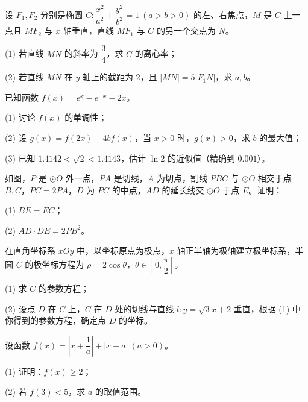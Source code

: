\begin{question}
设 $F_1,F_2$ 分别是椭圆 $C:\dfrac{x^2}{a^2}+\dfrac{y^2}{b^2}=1\ (a>b>0)$ 的左、右焦点，$M$ 是 $C$ 上一点且 $MF_2$ 与 $x$ 轴垂直，直线 $MF_1$ 与 $C$ 的另一个交点为 $N$。

(1) 若直线 $MN$ 的斜率为 $\dfrac34$，求 $C$ 的离心率；

(2) 若直线 $MN$ 在 $y$ 轴上的截距为 $2$，且 $|MN|=5|F_1N|$，求 $a,b$。

\end{question}
\begin{question}
已知函数 $f(x)=e^x-e^{-x}-2x$。

(1) 讨论 $f(x)$ 的单调性；

(2) 设 $g(x)=f(2x)-4bf(x)$，当 $x>0$ 时，$g(x)>0$，求 $b$ 的最大值；

(3) 已知 $1.4142<\sqrt2<1.4143$，估计 $\ln2$ 的近似值（精确到 $0.001$）。

\Needspace{0.4\textheight}
\end{question}
\begin{question}
如图，$P$ 是 $\odot O$ 外一点，$PA$ 是切线，$A$ 为切点，割线 $PBC$ 与 $\odot O$ 相交于点 $B,C$，$PC=2PA$，$D$ 为 $PC$ 的中点，$AD$ 的延长线交 $\odot O$ 于点 $E$。证明：
\nopagebreak[4]
\begin{center}\end{center}
\nopagebreak[4]
(1) $BE=EC$；

(2) $AD\cdot DE=2PB^2$。

\end{question}
\begin{question}
在直角坐标系 $xOy$ 中，以坐标原点为极点，$x$ 轴正半轴为极轴建立极坐标系，半圆 $C$ 的极坐标方程为 $\rho=2\cos\theta$，$\theta\in\left[0,\dfrac\pi2\right]$。

(1) 求 $C$ 的参数方程；

(2) 设点 $D$ 在 $C$ 上，$C$ 在 $D$ 处的切线与直线 $l:y=\sqrt3x+2$ 垂直，根据 (1) 中你得到的参数方程，确定点 $D$ 的坐标。

\end{question}
\begin{question}
设函数 $f(x)=\left|x+\dfrac1a\right|+|x-a|\ (a>0)$。

(1) 证明：$f(x)\geqslant2$；

(2) 若 $f(3)<5$，求 $a$ 的取值范围。

\end{question}
